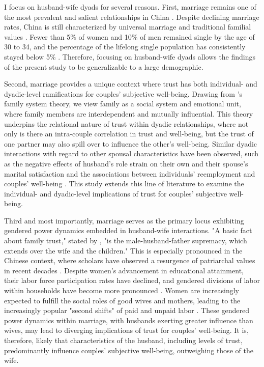 I focus on husband-wife dyads for several reasons. First, marriage remains one of the most prevalent and salient relationships in China \parencite{jiangMarriageSqueezeNeverMarried2014,yanChineseFamiliesUpside2021}. Despite declining marriage rates, China is still characterized by universal marriage and traditional familial values \parencite{jiHeterogeneityContemporaryChinese2014}. Fewer than 5\% of women and 10\% of men remained single by the age of 30 to 34, and the percentage of the lifelong single population has consistently stayed below 5\% \parencite{jiangMarriageSqueezeNeverMarried2014}. Therefore, focusing on husband-wife dyads allows the findings of the present study to be generalizable to a large demographic.

Second, marriage provides a unique context where trust has both individual- and dyadic-level ramifications for couples' subjective well-being. Drawing from \citeauthor{bowenUseFamilyTheory1966}'s \citeyear{bowenUseFamilyTheory1966} family system theory, we view family as a social system and emotional unit, where family members are interdependent and mutually influential. This theory underpins the relational nature of trust within dyadic relationships, where not only is there an intra-couple correlation in trust and well-being, but the trust of one partner may also spill over to influence the other's well-being. Similar dyadic interactions with regard to other spousal characteristics have been observed, such as the negative effects of husband's role strain on their own and their spouse's marital satisfaction \parencite{brockLongitudinalInvestigationStress2008} and the associations between individuals' reemployment and couples' well-being \parencite{scheuringDoesFixedTermEmployment2021}. This study extends this line of literature to examine the individual- and dyadic-level implications of trust for couples' subjective well-being.

Third and most importantly, marriage serves as the primary locus exhibiting gendered power dynamics embedded in husband-wife interactions. "A basic fact about family trust," stated by \textcite[p~27]{barberLogicLimitsTrust1983}, "is the male-husband-father supremacy, which extends over the wife and the children." This is especially pronounced in the Chinese context, where scholars have observed a resurgence of patriarchal values in recent decades \parencite{jiUnequalCareUnequal2017}. Despite women's advancement in educational attainment, their labor force participation rates have declined, and gendered divisions of labor within households have become more pronounced \parencite{jiUnequalCareUnequal2017,luoGenderDivisionHousehold2018}. Women are increasingly expected to fulfill the social roles of good wives and mothers, leading to the increasingly popular "second shifts" of paid and unpaid labor \parencite{muChangingPatternsDeterminants2022}. These gendered power dynamics within marriage, with husbands exerting greater influence than wives, may lead to diverging implications of trust for couples' well-being. It is, therefore, likely that characteristics of the husband, including levels of trust, predominantly influence couples' subjective well-being, outweighing those of the wife.

